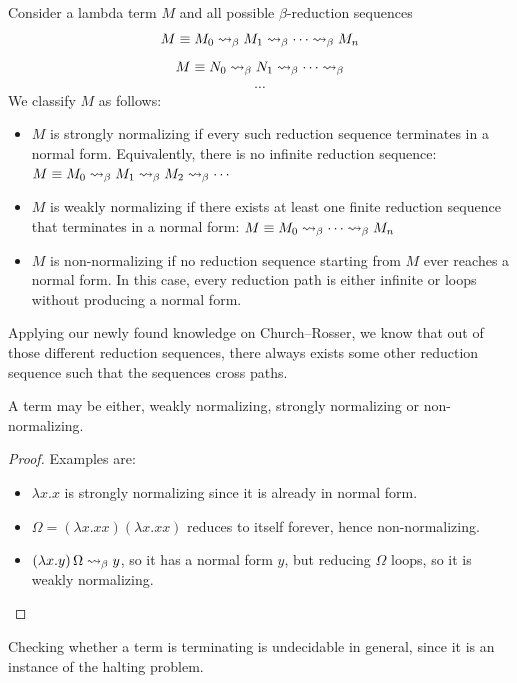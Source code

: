 \begin{definition} Consider a lambda term \(M\) and all possible \(\beta\)-reduction sequences
\[
  M \equiv M_0 \mathrel{\leadsto}_\beta M_1 \mathrel{\leadsto}_\beta \cdots \mathrel{\leadsto}_\beta M_n
\]
\[
  M \equiv N_0 \mathrel{\leadsto}_\beta N_1 \mathrel{\leadsto}_\beta \cdots \mathrel{\leadsto}_\beta
\]
\[
  \cdots
\]
We classify \(M\) as follows:
\begin{itemize}
    \item \(M\) is strongly normalizing if every such reduction sequence terminates in a normal form. Equivalently, there is no infinite reduction sequence:
    \(
    M \equiv M_0 \mathrel{\leadsto}_\beta M_1 \mathrel{\leadsto}_\beta M_2 \mathrel{\leadsto}_\beta \cdots
    \)
    \item \(M\) is weakly normalizing if there exists at least one finite reduction sequence     that terminates in a normal form:
    \(
    M \equiv M_0 \mathrel{\leadsto}_\beta \cdots \mathrel{\leadsto}_\beta M_n
    \)
    \item \(M\) is non-normalizing if no reduction sequence starting from \(M\) ever reaches a normal form. In this case, every reduction path is either infinite or loops without producing a normal form.
\end{itemize}
\end{definition}
\begin{note}
  Applying our newly found knowledge on Church--Rosser, we know that out of those different reduction sequences, there always exists some other reduction sequence such that the sequences cross paths.
\end{note}
\begin{proposition}
  A term may be either, weakly normalizing, strongly normalizing or non-normalizing.
\end{proposition}
\begin{proof} Examples are:
  \label{ex:omega}
\begin{itemize}
\item \(\lambda x. x\) is strongly normalizing since it is already in normal form.
\item \(\Omega = (\lambda x. x x)(\lambda x. x x)\) reduces to itself forever, hence non-normalizing.
\item \((\lambda x. y)\, \Omega \mathrel{\leadsto}_\beta y\), so it has a normal form \(y\), but reducing \(\Omega\) loops, so it is weakly normalizing.
\end{itemize}
\end{proof}
\begin{remark}
  Checking whether a term is terminating is undecidable in general, since it is an instance of the halting problem.
\end{remark}

